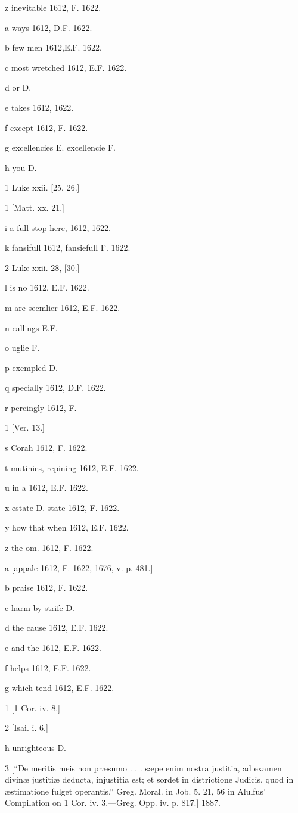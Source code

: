 z
inevitable 1612, F. 1622.

a
ways 1612, D.F. 1622.

b
few men 1612,E.F. 1622.

c
most wretched 1612, E.F. 1622.

d
or D.

e
takes 1612, 1622.

f
except 1612, F. 1622.

g
excellencies E. excellencie F.

h
you D.

1
Luke xxii. [25, 26.]

1
[Matt. xx. 21.]

i
a full stop here, 1612, 1622.

k
fansifull 1612, fansiefull F. 1622.

2
Luke xxii. 28, [30.]

l
is no 1612, E.F. 1622.

m
are seemlier 1612, E.F. 1622.

n
callings E.F.

o
uglie F.

p
exempled D.

q
specially 1612, D.F. 1622.

r
percingly 1612, F.

1
[Ver. 13.]

s
Corah 1612, F. 1622.

t
mutinies, repining 1612, E.F. 1622.

u
in a 1612, E.F. 1622.

x
estate D. state 1612, F. 1622.

y
how that when 1612, E.F. 1622.

z
the om. 1612, F. 1622.

a
[appale 1612, F. 1622, 1676, v. p. 481.]

b
praise 1612, F. 1622.

c
harm by strife D.

d
the cause 1612, E.F. 1622.

e
and the 1612, E.F. 1622.

f
helps 1612, E.F. 1622.

g
which tend 1612, E.F. 1622.

1
[1 Cor. iv. 8.]

2
[Isai. i. 6.]

h
unrighteous D.

3
[“De meritis meis non præsumo . . . sæpe enim nostra justitia, ad examen divinæ justitiæ deducta, injustitia est; et sordet in districtione Judicis, quod in æstimatione fulget operantis.” Greg. Moral. in Job. 5. 21, 56 in Alulfus’ Compilation on 1 Cor. iv. 3.—Greg. Opp. iv. p. 817.] 1887.

